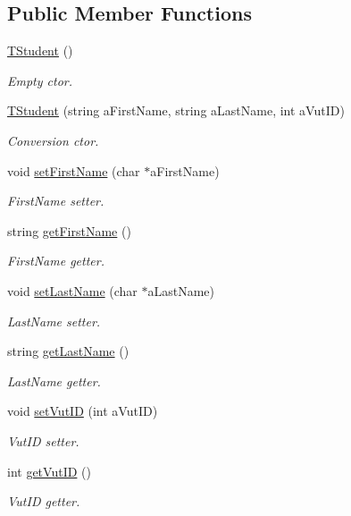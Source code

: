 \subsection*{Public Member Functions}
\begin{DoxyCompactItemize}
\item 
\hyperlink{class_c_value___t_student_1_1_t_student_a74a3e09459dba1212903e64ed0e2dd12}{T\+Student} ()
\begin{DoxyCompactList}\small\item\em Empty c\textquotesingle{}tor. \end{DoxyCompactList}\item 
\hyperlink{class_c_value___t_student_1_1_t_student_a4bac9f104a6e45a8af711c44fdc04f49}{T\+Student} (string a\+First\+Name, string a\+Last\+Name, int a\+Vut\+ID)
\begin{DoxyCompactList}\small\item\em Conversion c\textquotesingle{}tor. \end{DoxyCompactList}\item 
void \hyperlink{class_c_value___t_student_1_1_t_student_a7f152b4b97a89d81f06be6bc311d8886}{set\+First\+Name} (char $\ast$a\+First\+Name)
\begin{DoxyCompactList}\small\item\em First\+Name setter. \end{DoxyCompactList}\item 
string \hyperlink{class_c_value___t_student_1_1_t_student_acf2f656f218fb601355fb633cba76484}{get\+First\+Name} ()
\begin{DoxyCompactList}\small\item\em First\+Name getter. \end{DoxyCompactList}\item 
void \hyperlink{class_c_value___t_student_1_1_t_student_a636775dee38bbcb2e4216f5c0bf91890}{set\+Last\+Name} (char $\ast$a\+Last\+Name)
\begin{DoxyCompactList}\small\item\em Last\+Name setter. \end{DoxyCompactList}\item 
string \hyperlink{class_c_value___t_student_1_1_t_student_a0a9973472084d571ad981641922fb5a4}{get\+Last\+Name} ()
\begin{DoxyCompactList}\small\item\em Last\+Name getter. \end{DoxyCompactList}\item 
void \hyperlink{class_c_value___t_student_1_1_t_student_a915ea3d513d4e807e4ac4bb3df62beeb}{set\+Vut\+ID} (int a\+Vut\+ID)
\begin{DoxyCompactList}\small\item\em Vut\+ID setter. \end{DoxyCompactList}\item 
int \hyperlink{class_c_value___t_student_1_1_t_student_a1cbaa40be181be3211ea886b429bde3d}{get\+Vut\+ID} ()
\begin{DoxyCompactList}\small\item\em Vut\+ID getter. \end{DoxyCompactList}\end{DoxyCompactItemize}
